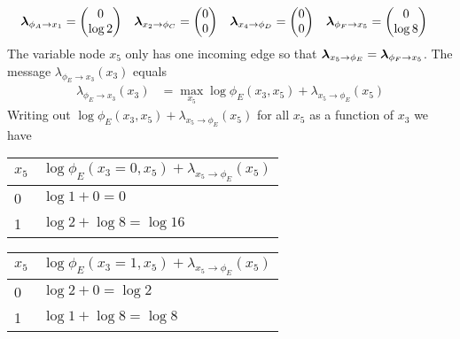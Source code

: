 \begin{exenumerate}
\begin{solution}
\begin{align}
        \boldsymbol{\lambda}_{\phi_A \to x_1} & = \begin{pmatrix}
          0\\
          \log 2
        \end{pmatrix}
        &
        \boldsymbol{\lambda}_{x_2 \to \phi_C} & = \begin{pmatrix}
          0\\
          0
        \end{pmatrix}
        &
        \boldsymbol{\lambda}_{x_4 \to \phi_D} &  = \begin{pmatrix}
          0\\
          0
        \end{pmatrix}
        &
        \boldsymbol{\lambda}_{\phi_F \to x_5} &  = \begin{pmatrix}
          0\\
          \log 8
        \end{pmatrix}
      \end{align}
      The variable node $x_5$ only has one incoming edge so that
      $\boldsymbol{\lambda}_{x_5 \to \phi_E} = \boldsymbol{\lambda}_{\phi_F \to x_5}$. The
      message $\lambda_{\phi_E \to x_3}(x_3)$ equals
      \begin{align}
        \lambda_{\phi_E \to x_3}(x_3) & = \max_{x_5} \log \phi_E(x_3, x_5) +  \lambda_{x_5 \to \phi_E}(x_5)
      \end{align}
      Writing out $\log \phi_E(x_3, x_5) +  \lambda_{x_5 \to \phi_E}(x_5)$ for all $x_5$ as a function of $x_3$ we have
      \begin{center}
        \begin{tabular}{ll}
          \toprule
          $x_5$ &  $\log \phi_E(x_3=0, x_5) +  \lambda_{x_5 \to \phi_E}(x_5)$\\
          \midrule
          0  &  $\log 1 + 0 =0$\\
          1  &  $\log 2 + \log 8 = \log 16$\\
          \bottomrule
        \end{tabular}
        \hspace{3ex}
        \begin{tabular}{ll}
          \toprule
          $x_5$ &  $\log \phi_E(x_3=1, x_5) +  \lambda_{x_5 \to \phi_E}(x_5)$\\
          \midrule
          0  &  $\log 2 + 0 =\log 2$\\
          1  &  $\log 1 + \log 8 = \log 8$\\
          \bottomrule
        \end{tabular}
      \end{center}

\end{solution}
\end{exenumerate}
